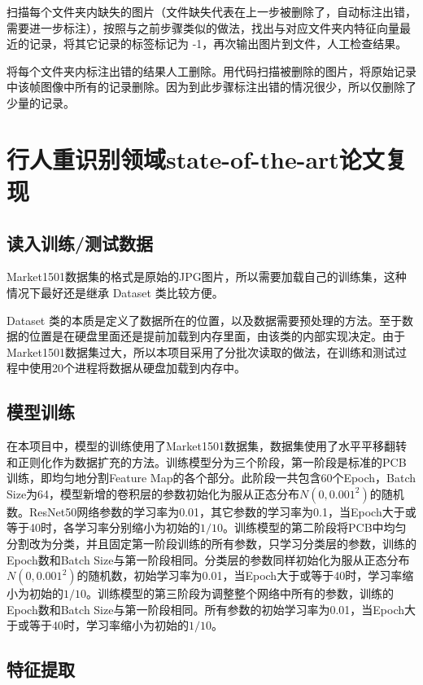 扫描每个文件夹内缺失的图片（文件缺失代表在上一步被删除了，自动标注出错，需要进一步标注），按照与之前步骤类似的做法，找出与对应文件夹内特征向量最近的记录，将其它记录的标签标记为 -1，再次输出图片到文件，人工检查结果。

将每个文件夹内标注出错的结果人工删除。用代码扫描被删除的图片，将原始记录中该帧图像中所有的记录删除。因为到此步骤标注出错的情况很少，所以仅删除了少量的记录。

\section{行人重识别领域state-of-the-art论文复现}

\subsection{读入训练/测试数据}
Market1501数据集的格式是原始的JPG图片，所以需要加载自己的训练集，这种情况下最好还是继承 Dataset 类比较方便。

Dataset 类的本质是定义了数据所在的位置，以及数据需要预处理的方法。至于数据的位置是在硬盘里面还是提前加载到内存里面，由该类的内部实现决定。由于Market1501数据集过大，所以本项目采用了分批次读取的做法，在训练和测试过程中使用20个进程将数据从硬盘加载到内存中。

\subsection{模型训练}

在本项目中，模型的训练使用了Market1501\cite{zheng2015scalable}数据集，数据集使用了水平平移翻转和正则化作为数据扩充的方法。训练模型分为三个阶段，第一阶段是标准的PCB训练，即均匀地分割Feature Map的各个部分。此阶段一共包含60个Epoch，Batch Size为64，模型新增的卷积层的参数初始化为服从正态分布$N(0, 0.001^2)$的随机数。ResNet50网络参数的学习率为0.01，其它参数的学习率为0.1，当Epoch大于或等于40时，各学习率分别缩小为初始的$1/10$。训练模型的第二阶段将PCB中均匀分割改为分类，并且固定第一阶段训练的所有参数，只学习分类层的参数，训练的Epoch数和Batch Size与第一阶段相同。分类层的参数同样初始化为服从正态分布$N(0, 0.001^2)$的随机数，初始学习率为0.01，当Epoch大于或等于40时，学习率缩小为初始的$1/10$。训练模型的第三阶段为调整整个网络中所有的参数，训练的Epoch数和Batch Size与第一阶段相同。所有参数的初始学习率为0.01，当Epoch大于或等于40时，学习率缩小为初始的$1/10$。

\subsection{特征提取}

